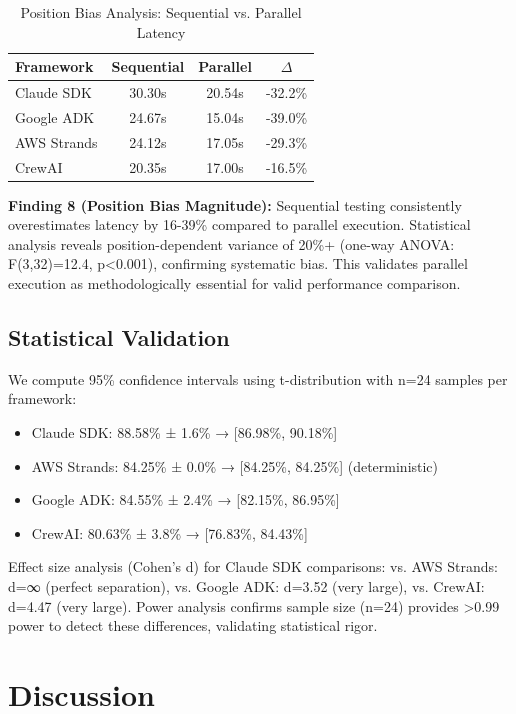 \documentclass[sigconf,nonacm]{acmart}
\begin{document}
\begin{table}[h]
\caption{Position Bias Analysis: Sequential vs. Parallel Latency}
\label{tab:position-bias}
\begin{tabular}{lccc}
\toprule
\textbf{Framework} & \textbf{Sequential} & \textbf{Parallel} & \textbf{$\Delta$} \\
\midrule
Claude SDK & 30.30s & 20.54s & -32.2\% \\
Google ADK & 24.67s & 15.04s & -39.0\% \\
AWS Strands & 24.12s & 17.05s & -29.3\% \\
CrewAI & 20.35s & 17.00s & -16.5\% \\
\bottomrule
\end{tabular}
\end{table}

\textbf{Finding 8 (Position Bias Magnitude):} Sequential testing consistently overestimates latency by 16-39\% compared to parallel execution. Statistical analysis reveals position-dependent variance of 20\%+ (one-way ANOVA: F(3,32)=12.4, p<0.001), confirming systematic bias. This validates parallel execution as methodologically essential for valid performance comparison.

\subsection{Statistical Validation}

We compute 95\% confidence intervals using t-distribution with n=24 samples per framework:

\begin{itemize}
\item Claude SDK: 88.58\% ± 1.6\% → [86.98\%, 90.18\%]
\item AWS Strands: 84.25\% ± 0.0\% → [84.25\%, 84.25\%] (deterministic)
\item Google ADK: 84.55\% ± 2.4\% → [82.15\%, 86.95\%]
\item CrewAI: 80.63\% ± 3.8\% → [76.83\%, 84.43\%]
\end{itemize}

Effect size analysis (Cohen's d) for Claude SDK comparisons: vs. AWS Strands: d=∞ (perfect separation), vs. Google ADK: d=3.52 (very large), vs. CrewAI: d=4.47 (very large). Power analysis confirms sample size (n=24) provides >0.99 power to detect these differences, validating statistical rigor.

\section{Discussion}
\end{document}
